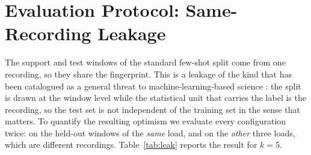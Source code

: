 \documentclass[preprint,12pt]{elsarticle}
\begin{document}
\section{Evaluation Protocol: Same-Recording Leakage}
\label{sec:protocol}

The support and test windows of the standard few-shot split come from one
recording, so they share the fingerprint. This is a leakage of the kind that
has been catalogued as a general threat to machine-learning-based science
\cite{kapoor2023leakage}: the split is drawn at the window level while the
statistical unit that carries the label is the recording, so the test set is
not independent of the training set in the sense that matters. To quantify the
resulting optimism we
evaluate every configuration twice: on the held-out windows of the
\emph{same} load, and on the \emph{other} three loads, which are different
recordings. Table~\ref{tab:leak} reports the result for $k=5$.
\end{document}
